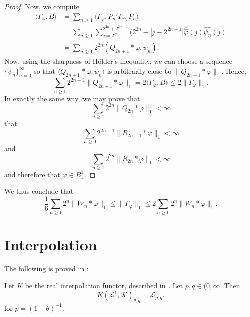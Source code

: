 \begin{proof}
    Now, we compute
    \begin{align*}
        \langle \Gamma_\varphi,B \rangle &= \sum_{n\geq 1} \langle \Gamma_\varphi,P_n'\Gamma_{\psi_n}P_n\rangle\\
        &= \sum_{n\geq 1} \sum_{j=2^{2n}}^{2^{2n}+2^{2n+1}}(2^{2n}-|j-2^{2n+1}|\overline{\widehat{\varphi}}(j)\widehat{\psi_n}(j)\\
        &= \sum_{n\geq 1} 2^{2n} (Q_{2n+1}*\varphi,\psi_n).
    \end{align*}
    Now, using the sharpness of H\"older's inequality, we can choose
    a sequence $\{\psi_n\}_{n=0}^\infty$ so that $\langle Q_{2n+1}*\varphi,\psi_n\rangle$
    is arbitrarily close to $\|Q_{2n+1}*\varphi\|_1$. Hence,
    \begin{equation*}
        \sum_{n\geq 1}2^{2n+1}\|Q_{2n+1}*\varphi\|_1 = 2\langle \Gamma_\varphi,B\rangle \leq 2\|\Gamma_\varphi\|_1.
    \end{equation*}
    In exactly the same way, we may prove that
    \begin{equation*}
        \sum_{n\geq 1}2^{2n}\|Q_{2n}*\varphi\|_1 < \infty
    \end{equation*} 
    that
    \begin{equation*}
        \sum_{n\geq 0} 2^{2n+1} \|R_{2n+1}*\varphi\|_1 < \infty
    \end{equation*}
    and
    \begin{equation*}
        \sum_{n\geq 1} 2^{2n}\|R_{2n}*\varphi\|_1 < \infty
    \end{equation*}
    and therefore that $\varphi \in B_1^1$.
\end{proof} 

\begin{remark}
    We thus conclude that
    \begin{equation*}
        \frac{1}{6}\sum_{n\geq 1}2^n \|W_n*\varphi\|_1 \leq \|\Gamma_\varphi\|_1 \leq 2\sum_{n\geq 0} 2^n\|W_n*\varphi\|_1.
    \end{equation*}
\end{remark}

\section{Interpolation}
The following is proved in \cite{DDP92}:
\begin{lemma}
    Let $K$ be the real interpolation functor, described in \cite{interp}. 
    Let $p,q \in (0,\infty]$
    Then
    \begin{equation*}
        K(\mathcal{L}^1,\mathcal{K})_{\theta,q} = \mathcal{L}_{p,q}.
    \end{equation*} 
    for $p = (1-\theta)^{-1}$.
\end{lemma}


